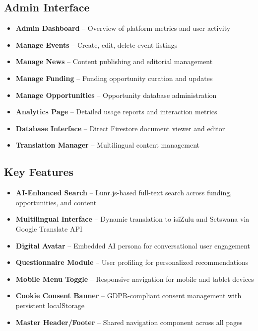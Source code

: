 \documentclass[a4paper,12pt]{article}
\begin{document}
\subsection{Admin Interface}
\begin{itemize}
    \item \textbf{Admin Dashboard} – Overview of platform metrics and user activity
    \item \textbf{Manage Events} – Create, edit, delete event listings
    \item \textbf{Manage News} – Content publishing and editorial management
    \item \textbf{Manage Funding} – Funding opportunity curation and updates
    \item \textbf{Manage Opportunities} – Opportunity database administration
    \item \textbf{Analytics Page} – Detailed usage reports and interaction metrics
    \item \textbf{Database Interface} – Direct Firestore document viewer and editor
    \item \textbf{Translation Manager} – Multilingual content management
\end{itemize}

\subsection{Key Features}
\begin{itemize}
    \item \textbf{AI-Enhanced Search} – Lunr.js-based full-text search across funding, opportunities, and content
    \item \textbf{Multilingual Interface} – Dynamic translation to isiZulu and Setswana via Google Translate API
    \item \textbf{Digital Avatar} – Embedded AI persona for conversational user engagement
    \item \textbf{Questionnaire Module} – User profiling for personalized recommendations
    \item \textbf{Mobile Menu Toggle} – Responsive navigation for mobile and tablet devices
    \item \textbf{Cookie Consent Banner} – GDPR-compliant consent management with persistent localStorage
    \item \textbf{Master Header/Footer} – Shared navigation component across all pages
\end{itemize}

\end{document}
